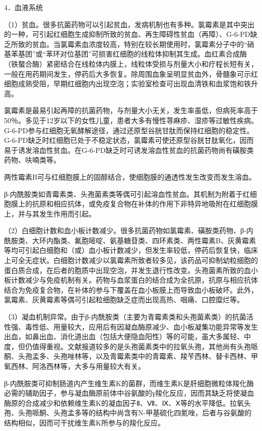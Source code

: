 4．血液系统

（1）贫血。很多抗菌药物可以引起贫血，发病机制也有多种。氯霉素是其中突出的一种，可引起红细胞生成抑制所致的贫血、再生障碍性贫血（再障）、G-6-PD缺乏所致的贫血。当氯霉素血浓度较高，特别在较长期使用时，氯霉素分子中的“硝基苯基团”或“苯环对位基团”可损害红细胞的线粒体抑制其生成。血红素合成酶（铁螯合酶）紧密结合在线粒体内膜上，线粒体受损与剂量大小和疗程长短有关，一般在用药期间发生，停药后大多恢复。除周围血象呈明显贫血外，骨髓象可示红细胞成熟受阻，早期红细胞内出现空泡；实验室检查可出现血清铁和血浆饱和铁升高。

氯霉素是最易引起再障的抗菌药物，与剂量大小无关，发生率虽低，但病死率高于50％。多见于12岁以下的女性儿童，患者大多有慢性荨麻疹、湿疹等过敏性疾病。G-6-PD参与红细胞无氧酵解途径，通过还原型谷胱甘肽而保持红细胞的稳定性。G-6-PD缺乏时红细胞已处于不稳定状态，氯霉素可使还原型谷胱甘肽氧化，因而易于诱发溶血性贫血。在G-6-PD缺乏时可诱发溶血性贫血的抗菌药物尚有磺胺类药物、呋喃类等。

两性霉素B可与红细胞膜上的固醇结合，使细胞膜的通透性发生改变而发生溶血。

β-内酰胺类如青霉素类、头孢菌素类等偶可引起溶血性贫血。其机制为附着于红细胞膜上的抗原和相应抗体，或免疫复合物在补体的作用下非特异地吸附在红细胞膜上，并与其发生作用而引起。

（2）白细胞计数和血小板计数减少。很多抗菌药物如氯霉素、磺胺类药物、β-内酰胺类、大环内酯类、氟胞嘧啶、氨基糖苷类、四环素类、两性霉素B、灰黄霉素等均可引起白细胞和（或）血小板计数减少，但发生率较低，停药后恢复快，临床上可全无症状。白细胞计数减少以氯霉素所致者较多见，该药品可抑制幼粒细胞的蛋白质合成，在后者的胞质中出现空泡，并发生退行性改变。头孢菌素所致的血小板计数减少与免疫机制有关。药物与血浆蛋白的结合成为全抗原，抗原与相应抗体结合为免疫复合物，在补体的参与下覆盖在血小板膜上而导致血小板破坏。此外，氯霉素、灰黄霉素等偶可引起粒细胞缺乏症而出现高热、咽痛、口腔糜烂等。

（3）凝血机制异常。由于β-内酰胺类（主要为青霉素类和头孢菌素类）的抗菌活性强、毒性低、用量较大，应用后有因凝血酶原减少、血小板凝集功能异常等发生出血，如鼻出血、消化道出血（包括大便隐血阳性）等的可能，虽大多属轻、中度，但仍值得重视。文献报道较多的是头孢菌素类中的拉氧头孢，其他尚有头孢哌酮、头孢孟多、头孢唑林等，以及青霉素类中的青霉素、羧苄西林、替卡西林、甲氧西林、阿洛西林等，大多与用量较大有关。

β-内酰胺类可抑制肠道内产生维生素K的菌群，而维生素K是肝细胞微粒体羧化酶必需的辅助因子，参与凝血酶原前体中谷氨酸的γ羧化反应，因而其缺乏将使凝血酶原的合成减少和依赖维生素K的凝血因子Ⅱ、Ⅶ、Ⅸ、Ⅹ等的水平降低。拉氧头孢、头孢哌酮、头孢孟多等的结构中尚含有N-甲基硫化四氮唑，后者与谷氨酸的结构相似，因而可干扰维生素K所参与的羧化反应。

